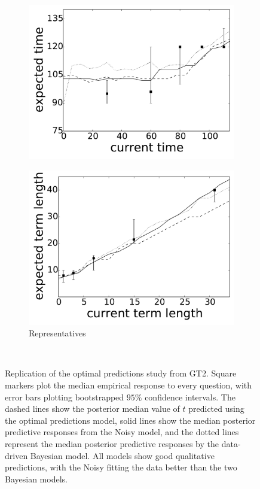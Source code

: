 \begin{figure}
{\begin{subfigure}{.33\textwidth}
		\includegraphics[width=1.0\textwidth]{predictions_figures/movie_runtimes_pred.pdf}
	\end{subfigure}
	\begin{subfigure}{.33\textwidth}
		\caption{Representatives}
		\includegraphics[width=1.0\textwidth]{predictions_figures/representatives_terms_pred.pdf}
	\end{subfigure}
	}\\
		
	\caption{Replication of the optimal predictions study from GT2. Square markers plot the median empirical response to every question, with error bars plotting bootstrapped $95\%$ confidence intervals. The dashed lines show the posterior median value of $t$ predicted using the optimal predictions model, solid lines show the median posterior predictive responses from the Noisy \mink model, and the dotted lines represent the median posterior predictive responses by the data-driven Bayesian model. All models show good qualitative predictions, with the Noisy \mink fitting the data better than the two Bayesian models.}
	\label{fig:emp_vs_mink_agg_predictive}
\end{figure}
        





